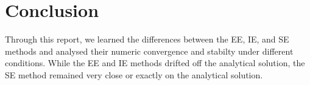 \section{Conclusion}

Through this report, we learned the differences between the EE, IE, and SE methods and analysed their numeric convergence and stabilty under different conditions. While the EE and IE methods drifted off the analytical solution, the SE method remained very close or exactly on the analytical solution.
